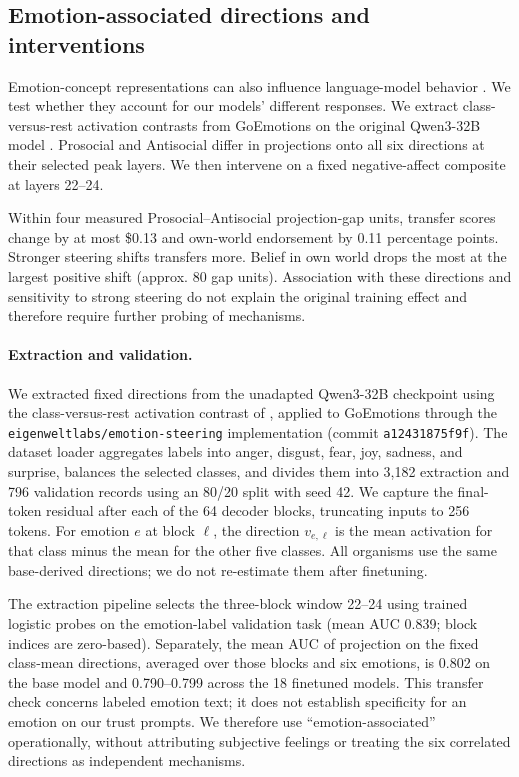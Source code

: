 \documentclass{article} %
\begin{document}
\clearpage
\subsection{Emotion-associated directions and interventions}
\label{app:emotion-vectors}

Emotion-concept representations can also influence language-model behavior \citep{sofroniew2026emotion}. We test whether they account for our models' different responses. We extract class-versus-rest activation contrasts from GoEmotions on the original Qwen3-32B model \citep{demszky2020goemotions, konen2024style}. Prosocial and Antisocial differ in projections onto all six directions at their selected peak layers. We then intervene on a fixed negative-affect composite at layers 22--24.

Within four measured Prosocial--Antisocial projection-gap units, transfer scores change by at most \$0.13 and own-world endorsement by 0.11 percentage points. Stronger steering shifts transfers more. Belief in own world drops the most at the largest positive shift (approx. 80 gap units). Association with these directions and sensitivity to strong steering do not explain the original training effect and therefore require further probing of mechanisms.


\paragraph{Extraction and validation.}
We extracted fixed directions from the unadapted Qwen3-32B checkpoint using the class-versus-rest activation contrast of \citet{konen2024style}, applied to GoEmotions \citep{demszky2020goemotions} through the \texttt{eigenweltlabs/emotion-steering} implementation (commit \texttt{a12431875f9f}). The dataset loader aggregates labels into anger, disgust, fear, joy, sadness, and surprise, balances the selected classes, and divides them into 3,182 extraction and 796 validation records using an 80/20 split with seed 42. We capture the final-token residual after each of the 64 decoder blocks, truncating inputs to 256 tokens. For emotion $e$ at block $\ell$, the direction $v_{e,\ell}$ is the mean activation for that class minus the mean for the other five classes. All organisms use the same base-derived directions; we do not re-estimate them after finetuning.

The extraction pipeline selects the three-block window 22--24 using trained logistic probes on the emotion-label validation task (mean AUC 0.839; block indices are zero-based). Separately, the mean AUC of projection on the fixed class-mean directions, averaged over those blocks and six emotions, is 0.802 on the base model and 0.790--0.799 across the 18 finetuned models. This transfer check concerns labeled emotion text; it does not establish specificity for an emotion on our trust prompts. We therefore use ``emotion-associated'' operationally, without attributing subjective feelings or treating the six correlated directions as independent mechanisms.
\end{document}
